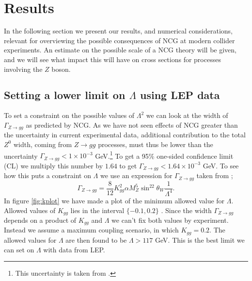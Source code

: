 \section{Results}
In the following section we present our results, and numerical considerations, relevant for overviewing the possible consequences of NCG at modern collider experiments. An estimate on the possible scale of a NCG theory will be given, and we will see what impact this will have on cross sections for processes involving the $Z$ boson.

\subsection{Setting a lower limit on $\Lambda$ using LEP data}
To set a constraint on the possible values of $\Lambda^2$ we can look at the width of $\Gamma_{Z \rightarrow gg}$ as predicted by NCG. As we have not seen effects of NCG greater than the uncertainty in current experimental data, additional contribution to the total $Z^0$ width, coming from $Z \rightarrow gg$ processes, must thus be lower than the uncertainty $\Gamma_{Z \rightarrow gg} < 1 \times 10^{-3}$ GeV.\footnote{This uncertainty is taken from \cite{behr2003dnc}.} To get a 95\% one-sided confidence limit (CL) we multiply this number by $1.64$ \cite{amsler2008rpp} to get $\Gamma_{Z \rightarrow gg} < 1.64 \times 10^{-3}$ GeV. To see how this puts a constraint on $\Lambda$ we use an expression for $\Gamma_{Z \rightarrow gg}$ taken from \cite{behr2003dnc};
\begin{equation} \label{eq:zggwidth}
	\Gamma_{Z \rightarrow gg} = \frac{8}{12} K_{gg}^2 \alpha M_Z^5 \sin^22\theta_W \frac{1}{\Lambda^4}.
\end{equation}
In figure \ref{fig:kplot} we have made a plot of the minimum allowed value for $\Lambda$. Allowed values of $K_{gg}$ lies in the interval $\{-0.1,0.2\}$ \cite{behr2003dnc}. Since the width $\Gamma_{Z \rightarrow gg}$ depends on a product of $K_{gg}$ and $\Lambda$ we can't fix both values by experiment. Instead we assume a maximum coupling scenario, in which $K_{gg}=0.2$. The allowed values for $\Lambda$ are then found to be $\Lambda >117$ GeV. This is the best limit we can set on $\Lambda$ with data from LEP.


